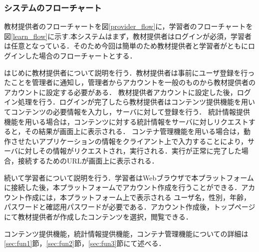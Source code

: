 \subsubsection{システムのフローチャート}
教材提供者のフローチャートを図\ref{provider_flow}に，学習者のフローチャートを図\ref{learn_flow}に示す.本システムはまず，教材提供者はログインが必須，学習者は任意となっている．そのため今回は簡単のため教材提供者と学習者がともにログインした場合のフローチャートとする．

はじめに教材提供者について説明を行う．教材提供者は事前にユーザ登録を行ったことを管理者に通知し，管理者からアカウントを一般のものから教材提供者のアカウントに設定する必要がある．
教材提供者アカウントに設定した後，ログイン処理を行う．ログインが完了したら教材提供者はコンテンツ提供機能を用いてコンテンツの必要情報を入力し，サーバに対して登録を行う．
統計情報提供機能を用いる場合は，コンテンツに対する統計情報をサーバに対しリクエストすると，その結果が画面上に表示される．
コンテナ管理機能を用いる場合は，動作させたいアプリケーションの情報をクライアント上で入力することにより，サーバに対しその情報がリクエストされ，実行される．実行が正常に完了した場合，接続するためのURLが画面上に表示される．

続いて学習者について説明を行う．学習者はWebブラウザで本プラットフォームに接続した後，本プラットフォームでアカウント作成を行うことができる．アカウント作成には，本プラットフォーム上で表示される
ユーザ名，性別，年齢，パスワードと確認用パスワードが必要である．アカウント作成後，トップページにて教材提供者が作成したコンテンツを選択，閲覧できる．


コンテンツ提供機能，統計情報提供機能，コンテナ管理機能についての詳細は\ref{sec:fun1}節，\ref{sec:fun2}節，\ref{sec:fun3}節にて述べる．

